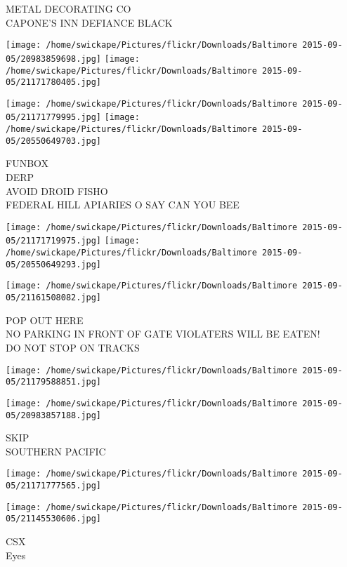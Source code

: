 \documentclass[10pt,letterpaper]{article}
\begin{document}
METAL DECORATING CO\\
CAPONE'S INN DEFIANCE BLACK\\
\pagebreak

\texttt{[image: /home/swickape/Pictures/flickr/Downloads/Baltimore 2015-09-05/20983859698.jpg]}
\texttt{[image: /home/swickape/Pictures/flickr/Downloads/Baltimore 2015-09-05/21171780405.jpg]}

\texttt{[image: /home/swickape/Pictures/flickr/Downloads/Baltimore 2015-09-05/21171779995.jpg]}
\texttt{[image: /home/swickape/Pictures/flickr/Downloads/Baltimore 2015-09-05/20550649703.jpg]}

FUNBOX\\
DERP\\
AVOID DROID FISHO\\
FEDERAL HILL APIARIES O SAY CAN YOU BEE\\
\pagebreak

\texttt{[image: /home/swickape/Pictures/flickr/Downloads/Baltimore 2015-09-05/21171719975.jpg]}
\texttt{[image: /home/swickape/Pictures/flickr/Downloads/Baltimore 2015-09-05/20550649293.jpg]}

\texttt{[image: /home/swickape/Pictures/flickr/Downloads/Baltimore 2015-09-05/21161508082.jpg]}

POP OUT HERE\\
NO PARKING IN FRONT OF GATE VIOLATERS WILL BE EATEN!\\
DO NOT STOP ON TRACKS\\
\pagebreak

\texttt{[image: /home/swickape/Pictures/flickr/Downloads/Baltimore 2015-09-05/21179588851.jpg]}

\vspace{0.25in}
\texttt{[image: /home/swickape/Pictures/flickr/Downloads/Baltimore 2015-09-05/20983857188.jpg]}

SKIP\\
SOUTHERN PACIFIC\\
\pagebreak

\texttt{[image: /home/swickape/Pictures/flickr/Downloads/Baltimore 2015-09-05/21171777565.jpg]}

\vspace{0.25in}
\texttt{[image: /home/swickape/Pictures/flickr/Downloads/Baltimore 2015-09-05/21145530606.jpg]}

CSX\\
Eyes\\
\pagebreak
\end{document}
